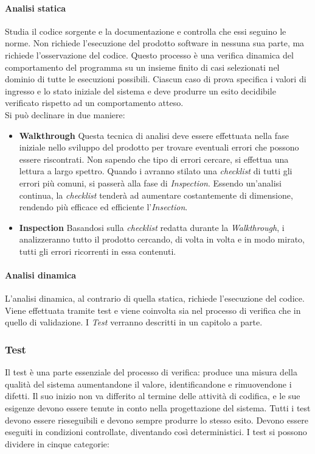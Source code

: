 \paragraph{Analisi statica}
Studia il codice sorgente e la documentazione e controlla che essi seguino le norme. Non richiede l'esecuzione del prodotto software in nessuna sua parte, ma richiede l'osservazione del codice. Questo processo è una verifica dinamica del comportamento del programma su un insieme finito di casi selezionati nel dominio di tutte le esecuzioni possibili. Ciascun caso di prova specifica i valori di ingresso e lo stato iniziale del sistema e deve produrre un esito decidibile verificato rispetto ad un comportamento atteso. 
\\Si può declinare in due maniere:
\begin{itemize}
	\item \textbf{Walkthrough}
	Questa tecnica di analisi deve essere effettuata nella fase iniziale nello sviluppo del prodotto per trovare eventuali errori che possono essere riscontrati. Non sapendo che tipo di errori cercare, si effettua una lettura a largo spettro. Quando i \vers avranno stilato una \emph{checklist} di tutti gli errori più comuni, si passerà alla fase di \emph{Inspection}. Essendo un'analisi continua, la \emph{checklist} tenderà ad aumentare costantemente di dimensione, rendendo più efficace ed efficiente l'\emph{Insection}.
	\item \textbf{Inspection} 
	Basandosi sulla \emph{checklist} redatta durante la \emph{Walkthrough}, i \vers analizzeranno tutto il prodotto cercando, di volta in volta e in modo mirato, tutti gli errori ricorrenti in essa contenuti.
\end{itemize}
\paragraph{Analisi dinamica}
L'analisi dinamica, al contrario di quella statica, richiede l'esecuzione del codice.
Viene effettuata tramite test e viene coinvolta sia nel processo di verifica che in quello di validazione.
I \emph{Test} verranno descritti in un capitolo a parte.
\subsubsection{Test}
Il test è una parte essenziale del processo di verifica: produce una misura della qualità del sistema
aumentandone il valore, identificandone e rimuovendone i difetti. Il suo inizio non va differito
al termine delle attività di codifica, e le sue esigenze devono essere tenute in conto nella progettazione
del sistema. Tutti i test devono essere rieseguibili e devono sempre produrre lo stesso esito. Devono
essere eseguiti in condizioni controllate, diventando così deterministici.
I test si possono dividere in cinque categorie:
